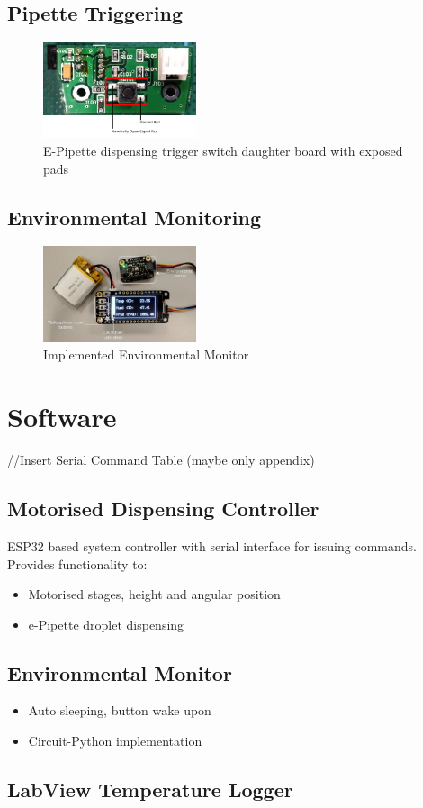 \subsection{Pipette Triggering}

\begin{figure}[h]
    \centering
    \includegraphics[width=0.4\textwidth]{img/trig_brd.png}
    \caption{E-Pipette dispensing trigger switch daughter board with exposed pads}
\end{figure}

\subsection{Environmental Monitoring}

\begin{figure}[h]
    \centering
    \includegraphics[width=0.4\textwidth]{img/env_mon.png}
    \caption{Implemented Environmental Monitor}
\end{figure}

\section{Software}

//Insert Serial Command Table (maybe only appendix)

\subsection{Motorised Dispensing Controller}
ESP32 based system controller with serial interface for issuing commands. Provides functionality to:
\begin{itemize}
    \item Motorised stages, height and angular position
    \item e-Pipette droplet dispensing
\end{itemize}

\subsection{Environmental Monitor}

\begin{itemize}
    \item Auto sleeping, button wake upon
    \item Circuit-Python implementation
\end{itemize}

\subsection{LabView Temperature Logger}

